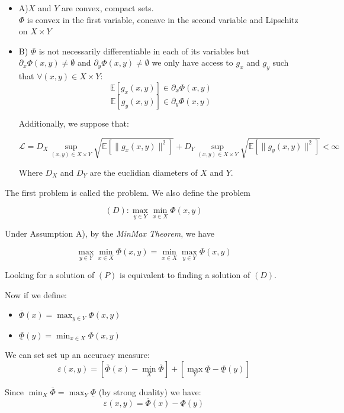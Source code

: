 \documentclass[10pt]{article}
\begin{document}
\begin{itemize}
\item A)$X$ and $Y$ are convex, compact sets.\\ $\Phi$ is convex in the first variable, concave in the second variable and Lipschitz on $X \times Y$
\item B) $\Phi$ is not necessarily differentiable in each of its variables but $\partial_{x} \Phi(x,y) \neq  \emptyset $ and $\partial_{y} \Phi(x,y) \neq  \emptyset $
 we only have access to $g_{x}$ and $g_{y}$ such that $\forall (x,y) \in X \times Y$: \\
$$\mathbb{E}[g_{x}(x,y)] \in \partial_{x} \Phi(x,y) $$
$$\mathbb{E}[g_{y}(x,y)] \in \partial_{y} \Phi(x,y) $$

Additionally, we suppose that:

$$
\mathcal{L} = D_{X} \sup_{(x,y) \in X \times Y} \sqrt{\mathbb{E}[\lVert g_{x}(x,y) \rVert^{2}]}+ D_{Y} \sup_{(x,y) \in X \times Y}\sqrt{\mathbb{E}[\lVert g_{y}(x,y) \rVert^{2}]} < \infty
$$

Where $D_{X}$ and $D_{Y}$ are the euclidian diameters of $X$ and $Y$.

\end{itemize}

The first problem is called the  problem. We also define the  problem

$$
(D): \max_{y \in Y}\min_{x \in X} \Phi(x,y)
$$

Under Assumption A), by the \emph{MinMax Theorem}, we have 

$$
\max_{y \in Y}\min_{x \in X} \Phi(x,y) = \min_{x \in X}\max_{y \in Y} \Phi(x,y)
$$

Looking for a solution of $(P)$ is equivalent to finding a solution of $(D)$.

Now if we define:
\begin{itemize}
\item $\overline{\Phi}(x) = \max_{y \in Y}\Phi(x,y)$
\item $\underline{\Phi}(y) = \min_{x \in X}\Phi(x,y)$
\end{itemize}



We can set set up  an accuracy measure:
$$
\boxed{ \varepsilon(x,y) = [\overline{\Phi}(x) - \min_{X}\overline{\Phi}] + [\max_{Y}\underline{\Phi} - \underline{\Phi}(y)] }
$$

Since $\min_{X}\overline{\Phi} = \max_{Y}\underline{\Phi}$ (by  strong duality) we have:
$$
\boxed{\varepsilon(x,y) = \overline{\Phi}(x) - \underline{\Phi}(y)}
$$
\end{document}
